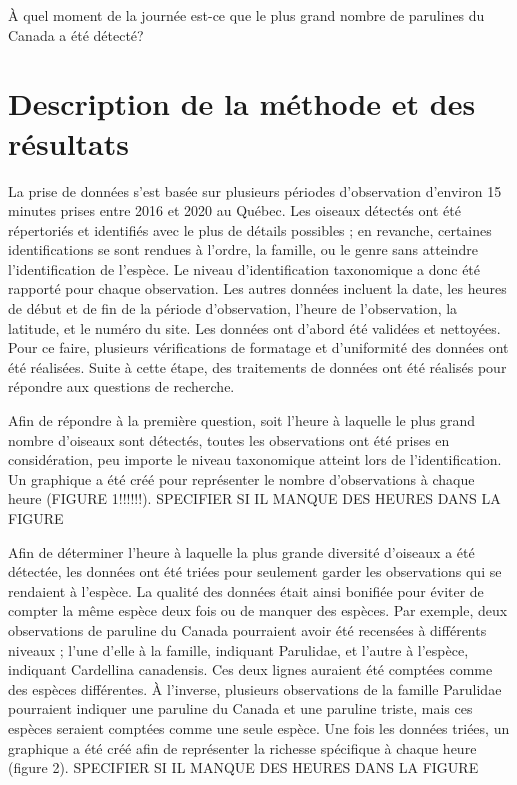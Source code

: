 \documentclass[9pt,twocolumn,twoside,]{pnas-new}
\begin{document}
À quel moment de la journée est-ce que le plus grand nombre de parulines
du Canada a été détecté?

\hypertarget{description-de-la-muxe9thode-et-des-ruxe9sultats}{%
\section*{Description de la méthode et des
résultats}\label{description-de-la-muxe9thode-et-des-ruxe9sultats}}

La prise de données s'est basée sur plusieurs périodes d'observation
d'environ 15 minutes prises entre 2016 et 2020 au Québec. Les oiseaux
détectés ont été répertoriés et identifiés avec le plus de détails
possibles ; en revanche, certaines identifications se sont rendues à
l'ordre, la famille, ou le genre sans atteindre l'identification de
l'espèce. Le niveau d'identification taxonomique a donc été rapporté
pour chaque observation. Les autres données incluent la date, les heures
de début et de fin de la période d'observation, l'heure de
l'observation, la latitude, et le numéro du site. Les données ont
d'abord été validées et nettoyées. Pour ce faire, plusieurs
vérifications de formatage et d'uniformité des données ont été
réalisées. Suite à cette étape, des traitements de données ont été
réalisés pour répondre aux questions de recherche.

Afin de répondre à la première question, soit l'heure à laquelle le plus
grand nombre d'oiseaux sont détectés, toutes les observations ont été
prises en considération, peu importe le niveau taxonomique atteint lors
de l'identification. Un graphique a été créé pour représenter le nombre
d'observations à chaque heure (FIGURE 1!!!!!!). SPECIFIER SI IL MANQUE
DES HEURES DANS LA FIGURE

Afin de déterminer l'heure à laquelle la plus grande diversité d'oiseaux
a été détectée, les données ont été triées pour seulement garder les
observations qui se rendaient à l'espèce. La qualité des données était
ainsi bonifiée pour éviter de compter la même espèce deux fois ou de
manquer des espèces. Par exemple, deux observations de paruline du
Canada pourraient avoir été recensées à différents niveaux ; l'une
d'elle à la famille, indiquant Parulidae, et l'autre à l'espèce,
indiquant Cardellina canadensis. Ces deux lignes auraient été comptées
comme des espèces différentes. À l'inverse, plusieurs observations de la
famille Parulidae pourraient indiquer une paruline du Canada et une
paruline triste, mais ces espèces seraient comptées comme une seule
espèce. Une fois les données triées, un graphique a été créé afin de
représenter la richesse spécifique à chaque heure (figure 2). SPECIFIER
SI IL MANQUE DES HEURES DANS LA FIGURE
\end{document}

